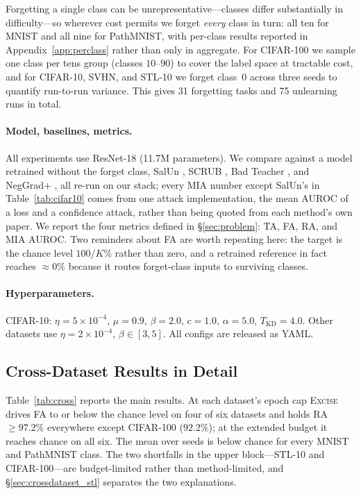 \documentclass{article}
\newcommand{\ours}{\textsc{Excise}}
\newcommand{\rev}[1]{{\color{revisedB}#1}}
\theoremstyle{remark}
\theoremstyle{plain}
\begin{document}
Forgetting a single class can be unrepresentative---classes differ substantially
in difficulty---so wherever cost permits we forget \emph{every} class in turn:
all ten for MNIST and all nine for PathMNIST, with per-class results reported in
Appendix~\ref{app:perclass} rather than only in aggregate. For CIFAR-100 we
sample one class per tens group (classes $10$--$90$) to cover the label space at
tractable cost, and for CIFAR-10, SVHN, and STL-10 we forget class~0 across
three seeds to quantify run-to-run variance. This gives 31 forgetting tasks and
75 unlearning runs in total.

\paragraph{Model, baselines, metrics.}
All experiments use ResNet-18 \citep{he2016resnet} (11.7M parameters). We
compare against \rev{a model retrained without the forget class}, SalUn
\citep{fan2024salun}, SCRUB \citep{kurmanji2023unbounded}, Bad Teacher
\citep{chundawat2023badteacher}, and NegGrad+ \citep{thudi2022unrolling}, all
re-run on our stack\rev{; every MIA number except SalUn's in
Table~\ref{tab:cifar10} comes from one attack implementation, the mean AUROC of
a loss and a confidence attack,} rather than being quoted from each method's own
paper. We report
the four metrics defined in \S\ref{sec:problem}: TA, FA, RA, and MIA AUROC. Two
reminders about FA are worth repeating here: the target is the chance level
$100/K\%$ rather than zero, and a retrained reference in fact reaches
${\approx}0\%$ because it routes forget-class inputs to surviving classes.

\paragraph{Hyperparameters.}
CIFAR-10: $\eta=5{\times}10^{-4}$, $\mu=0.9$, $\beta=2.0$, $c=1.0$,
$\alpha=5.0$, $T_{\mathrm{KD}}=4.0$. Other datasets use
$\eta=2{\times}10^{-4}$, $\beta\in[3,5]$. All configs are released as YAML.

\subsection{Cross-Dataset Results in Detail}\label{app:cross}

Table~\ref{tab:cross} reports the main results. At \rev{each dataset's epoch
cap} \ours{} drives FA to or below the chance level on four of six datasets and holds
RA $\ge 97.2\%$ everywhere except CIFAR-100 ($92.2\%$); at the extended budget it
reaches chance on all six. \rev{The mean over seeds is below chance for every
MNIST and PathMNIST class.} The
two shortfalls in the upper block---STL-10 and CIFAR-100---are budget-limited
rather than method-limited, and \S\ref{sec:crossdataset_stl} separates the two
explanations.
\end{document}
